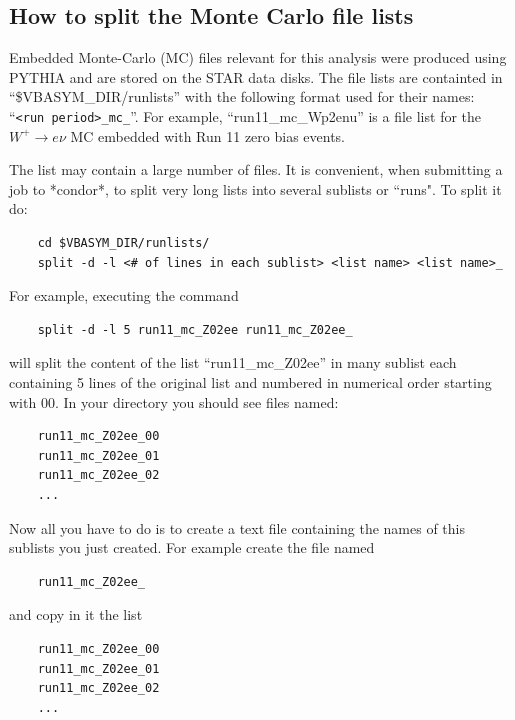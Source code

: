 \documentclass[12pt]{article}
\begin{document}
\subsection{How to split the Monte Carlo file lists}

Embedded Monte-Carlo (MC) files relevant for this analysis were produced using PYTHIA
and are stored on the STAR data disks. The file lists are containted in
``\$VBASYM\_DIR/runlists'' with the following format used for their names: ``\texttt{<run
period>\_mc\_<process type>}''. For example, ``run11\_mc\_Wp2enu'' is a file list for
the $W^{+}\rightarrow e\nu$ MC embedded with Run 11 zero bias events.

The list may contain a large number of files. It is convenient, when submitting
a job to *condor*, to split very long lists into several sublists or ``runs". To
split it do:

\begin{lstlisting}
    cd $VBASYM_DIR/runlists/
    split -d -l <# of lines in each sublist> <list name> <list name>_
\end{lstlisting}

For example, executing the command

\begin{lstlisting}
    split -d -l 5 run11_mc_Z02ee run11_mc_Z02ee_
\end{lstlisting}

will split the content of the list ``run11\_mc\_Z02ee'' in many sublist each
containing 5 lines of the original list and numbered in numerical order starting
with 00. In your directory you should see files named:

\begin{lstlisting}
    run11_mc_Z02ee_00
    run11_mc_Z02ee_01
    run11_mc_Z02ee_02
    ...
\end{lstlisting}

Now all you have to do is to create a text file containing the names of this
sublists you just created. For example create the file named

\begin{lstlisting}
    run11_mc_Z02ee_
\end{lstlisting}

and copy in it the list

\begin{lstlisting}
    run11_mc_Z02ee_00
    run11_mc_Z02ee_01
    run11_mc_Z02ee_02
    ...
\end{lstlisting}
\end{document}
